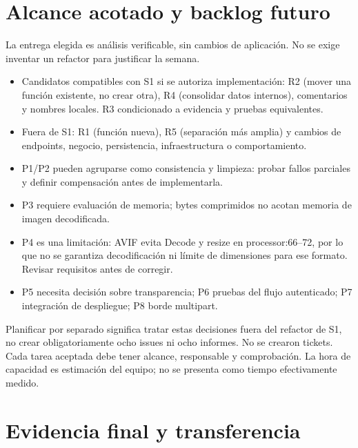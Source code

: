 \documentclass[11pt,a4paper]{article}
\begin{document}
\section{Alcance acotado y backlog futuro}
La entrega elegida es análisis verificable, sin cambios de aplicación. No se exige inventar un refactor para justificar la semana.
\begin{itemize}
\item Candidatos compatibles con S1 si se autoriza implementación: R2 (mover una función existente, no crear otra), R4 (consolidar datos internos), comentarios y nombres locales. R3 condicionado a evidencia y pruebas equivalentes.
\item Fuera de S1: R1 (función nueva), R5 (separación más amplia) y cambios de endpoints, negocio, persistencia, infraestructura o comportamiento.
\item P1/P2 pueden agruparse como consistencia y limpieza: probar fallos parciales y definir compensación antes de implementarla.
\item P3 requiere evaluación de memoria; bytes comprimidos no acotan memoria de imagen decodificada.
\item P4 es una limitación: AVIF evita Decode y resize en processor:66--72, por lo que no se garantiza decodificación ni límite de dimensiones para ese formato. Revisar requisitos antes de corregir.
\item P5 necesita decisión sobre transparencia; P6 pruebas del flujo autenticado; P7 integración de despliegue; P8 borde multipart.
\end{itemize}
Planificar por separado significa tratar estas decisiones fuera del refactor de S1, no crear obligatoriamente ocho issues ni ocho informes. No se crearon tickets. Cada tarea aceptada debe tener alcance, responsable y comprobación. La hora de capacidad es estimación del equipo; no se presenta como tiempo efectivamente medido.

\section{Evidencia final y transferencia}
\end{document}
